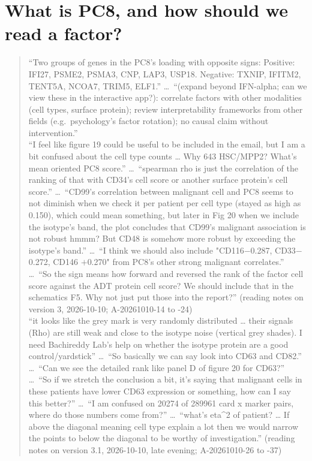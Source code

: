 \section{What is PC8, and how should we read a factor?}
\label{sec:pc8}

\begin{quote}
``Two groups of genes in the PC8's loading with opposite signs: Positive: IFI27, PSME2, PSMA3, CNP, LAP3, USP18. Negative: TXNIP, IFITM2, TENT5A, NCOA7, TRIM5, ELF1.'' \ldots\ ``(expand beyond IFN-alpha; can we view these in the interactive app?): correlate factors with other modalities (cell types, surface protein); review interpretability frameworks from other fields (e.g.\ psychology's factor rotation); no causal claim without intervention.''\\[2pt]
``I feel like figure 19 could be useful to be included in the email, but I am a bit confused about the cell type counts \ldots{} Why 643 HSC/MPP2? What's mean oriented PC8 score.'' \ldots\ ``spearman rho is just the correlation of the ranking of that with CD34's cell score or another surface protein's cell score.'' \ldots\ ``CD99's correlation between malignant cell and PC8 seems to not diminish when we check it per patient per cell type (stayed as high as 0.150), which could mean something, but later in Fig 20 when we include the isotype's band, the plot concludes that CD99's malignant association is not robust hmmm? But CD48 is somehow more robust by exceeding the isotype's band.'' \ldots\ ``I think we should also include "CD116$-$0.287, CD33$-$0.272, CD146 $+$0.270" from PC8's other strong malignant correlates.'' \ldots\ ``So the sign means how forward and reversed the rank of the factor cell score against the ADT protein cell score? We should include that in the schematics F5. Why not just put those into the report?'' (reading notes on version 3, 2026-10-10; A-20261010-14 to -24)\\[2pt]
``it looks like the grey mark is very randomly distributed \ldots{} their signals (Rho) are still weak and close to the isotype noise (vertical grey shades). I need Bachireddy Lab's help on whether the isotype protein are a good control/yardstick'' \ldots\ ``So basically we can say look into CD63 and CD82.'' \ldots\ ``Can we see the detailed rank like panel D of figure 20 for CD63?'' \ldots\ ``So if we stretch the conclusion a bit, it's saying that malignant cells in these patients have lower CD63 expression or something, how can I say this better?'' \ldots\ ``I am confused on 20274 of 289961 card x marker pairs, where do those numbers come from?'' \ldots\ ``what's eta\textasciicircum 2 of patient? \ldots{} If above the diagonal meaning cell type explain a lot then we would narrow the points to below the diagonal to be worthy of investigation.'' (reading notes on version 3.1, 2026-10-10, late evening; A-20261010-26 to -37)\\[2pt]

\end{quote}
